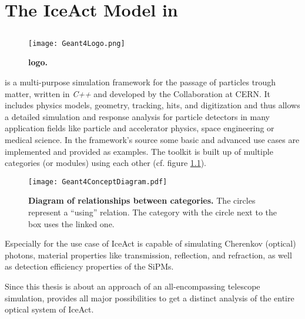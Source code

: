 \chapter{The IceAct Model in \geant}

\section{\geant}

\begin{wrapfigure}{r}{0.5\textwidth}
	\centering
	\texttt{[image: Geant4Logo.png]}
	\caption[\geant logo]{\textbf{\geant logo.} \cite{geant4:logo}}	
\end{wrapfigure}
\geant is a multi-purpose simulation framework for the passage of particles trough matter, written in \textit{C++} and developed by the \geant Collaboration at CERN. It includes physics models, geometry, tracking, hits, and digitization and thus allows a detailed simulation and response analysis for particle detectors in many application fields like particle and accelerator physics, space engineering or medical science. In the framework's source some basic and advanced use cases are implemented and provided as examples. The toolkit is built up of multiple categories (or modules) using each other (cf. figure \ref{geant4:categories}).~\cite{geant4}

\begin{figure}[H]
	\centering
	\texttt{[image: Geant4ConceptDiagram.pdf]}
	\caption[\geant category diagram]{\textbf{Diagram of relationships between \geant categories.} \cite{geant4} The circles represent a \enquote{using} relation. The category with the circle next to the box uses the linked one.}	
	\label{geant4:categories}
\end{figure}

Especially for the use case of IceAct \geant is capable of simulating Cherenkov (optical) photons, material properties like transmission, reflection, and refraction, as well as detection efficiency properties of the SiPMs.

Since this thesis is about an approach of an all-encompassing telescope simulation, \geant provides all major possibilities to get a distinct analysis of the entire optical system of IceAct.

